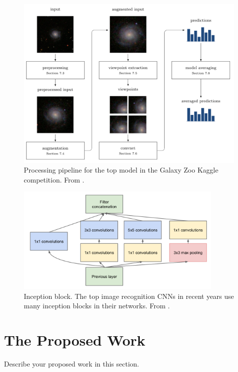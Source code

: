 \documentclass{article}
\begin{document}
\begin{figure}[h]
  \centering
	\includegraphics[width=130mm]{../img/GZ2_network.png}
  \caption{Processing pipeline for the top model in the Galaxy Zoo Kaggle competition. From \cite{2015MNRAS.450.1441D}.}
  \label{fig:GZ2_network}
\end{figure}

\begin{figure}[h]
  \centering
	\includegraphics[width=100mm]{../img/inception.png}
  \caption{Inception block. The top image recognition CNNs in recent years use many inception blocks in their networks. From \cite{2014arXiv1409.4842S}.}
  \label{fig:inception}
\end{figure}




\section{The Proposed Work}
Describe your proposed work in this section. 

 
\end{document}
